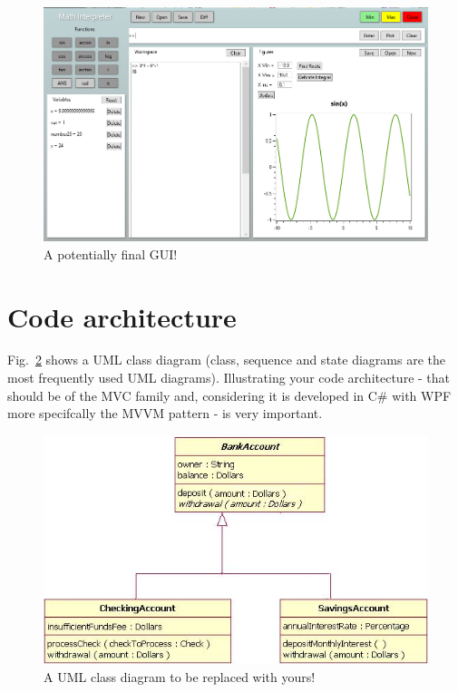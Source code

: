 \documentclass[a4paper, oneside, 11pt]{report}
\begin{document}
	\begin{figure}[htb]
		\includegraphics[width=0.9 \columnwidth]{GUI_02.png}
		\caption{A potentially final GUI!}
		\label{gui02}
	\end{figure}

	\section{Code architecture}

	Fig.\ \ref{class} shows a UML class diagram (class, sequence and state diagrams are the most frequently used UML diagrams). Illustrating your code architecture - that should be of the MVC family and, considering it is developed in C\# with WPF more specifcally the MVVM pattern - is very important.

	\begin{figure}[htb]
		\includegraphics[width=1.0 \columnwidth]{class.png}
		\caption{A UML class diagram to be replaced with yours!}
		\label{class}
	\end{figure}
\end{document}
